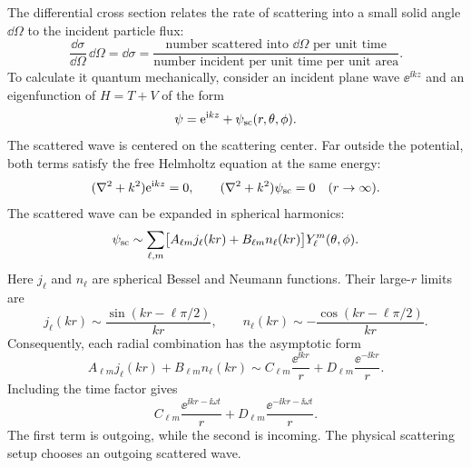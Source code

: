 The differential cross section relates the rate of scattering into a
small solid angle $\dd\Omega$ to the incident particle flux:
\[
 \frac{\dd\sigma}{\dd\Omega}\,\dd\Omega
 =\dd\sigma
 =\frac{\text{number scattered into }\dd\Omega\text{ per unit time}}
        {\text{number incident per unit time per unit area}}.
\]
To calculate it quantum mechanically, consider an incident plane wave
$\ee^{\ii kz}$ and an eigenfunction of $H=T+V$ of the form
\[
 \psi=\mathrm{e}^{\mathrm{i} kz}+\psi_{\rm sc}(r,\theta,\phi).
\]
The scattered wave is centered on the scattering center. Far outside
the potential, both terms satisfy the free Helmholtz equation at the
same energy:
\[
 (\nabla^2+k^2)\mathrm{e}^{\mathrm{i} kz}=0,\qquad
 (\nabla^2+k^2)\psi_{\rm sc}=0\quad(r\to\infty).
\]
The scattered wave can be expanded in spherical harmonics:
\[
 \psi_{\rm sc}\sim\sum_{\ell,m}
 \bigl[A_{\ell m}j_\ell(kr)+B_{\ell m}n_\ell(kr)\bigr]
 Y_\ell^m(\theta,\phi).
\]
Here $j_\ell$ and $n_\ell$ are spherical Bessel and Neumann functions.
Their large-$r$ limits are
\[
 j_\ell(kr)\sim\frac{\sin(kr-\ell\pi/2)}{kr},\qquad
 n_\ell(kr)\sim-\frac{\cos(kr-\ell\pi/2)}{kr}.
\]
Consequently, each radial combination has the asymptotic form
\[
 A_{\ell m}j_\ell(kr)+B_{\ell m}n_\ell(kr)
 \sim C_{\ell m}\frac{\ee^{\ii kr}}r
      +D_{\ell m}\frac{\ee^{-\ii kr}}r.
\]
Including the time factor gives
\[
 C_{\ell m}\frac{\ee^{\ii kr-\ii\omega t}}r
 +D_{\ell m}\frac{\ee^{-\ii kr-\ii\omega t}}r.
\]
The first term is outgoing, while the second is incoming. The physical
scattering setup chooses an outgoing scattered wave.
